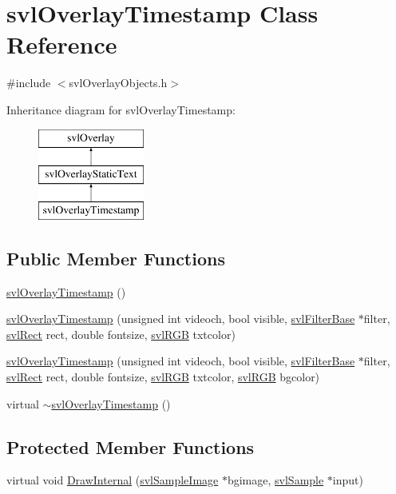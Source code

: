 \hypertarget{classsvl_overlay_timestamp}{\section{svl\-Overlay\-Timestamp Class Reference}
\label{classsvl_overlay_timestamp}
}


{\ttfamily \#include $<$svl\-Overlay\-Objects.\-h$>$}

Inheritance diagram for svl\-Overlay\-Timestamp\-:\begin{figure}[H]
\begin{center}
\leavevmode
\includegraphics[height=3.000000cm]{d8/d02/classsvl_overlay_timestamp}
\end{center}
\end{figure}
\subsection*{Public Member Functions}
\begin{DoxyCompactItemize}
\item 
\hyperlink{classsvl_overlay_timestamp_a642331157995ad7952ea5b6db61d4cf6}{svl\-Overlay\-Timestamp} ()
\item 
\hyperlink{classsvl_overlay_timestamp_a999c8598ce878ec5a263d279929c88ce}{svl\-Overlay\-Timestamp} (unsigned int videoch, bool visible, \hyperlink{classsvl_filter_base}{svl\-Filter\-Base} $\ast$filter, \hyperlink{structsvl_rect}{svl\-Rect} rect, double fontsize, \hyperlink{structsvl_r_g_b}{svl\-R\-G\-B} txtcolor)
\item 
\hyperlink{classsvl_overlay_timestamp_a2dc4f64758cdc371078cf9e267bd5f2a}{svl\-Overlay\-Timestamp} (unsigned int videoch, bool visible, \hyperlink{classsvl_filter_base}{svl\-Filter\-Base} $\ast$filter, \hyperlink{structsvl_rect}{svl\-Rect} rect, double fontsize, \hyperlink{structsvl_r_g_b}{svl\-R\-G\-B} txtcolor, \hyperlink{structsvl_r_g_b}{svl\-R\-G\-B} bgcolor)
\item 
virtual \hyperlink{classsvl_overlay_timestamp_a8e7dce43e7d99a73736a87f70e91be50}{$\sim$svl\-Overlay\-Timestamp} ()
\end{DoxyCompactItemize}
\subsection*{Protected Member Functions}
\begin{DoxyCompactItemize}
\item 
virtual void \hyperlink{classsvl_overlay_timestamp_aa89bfa57017c4b2bcc790fed9aac6c9a}{Draw\-Internal} (\hyperlink{classsvl_sample_image}{svl\-Sample\-Image} $\ast$bgimage, \hyperlink{classsvl_sample}{svl\-Sample} $\ast$input)
\end{DoxyCompactItemize}
